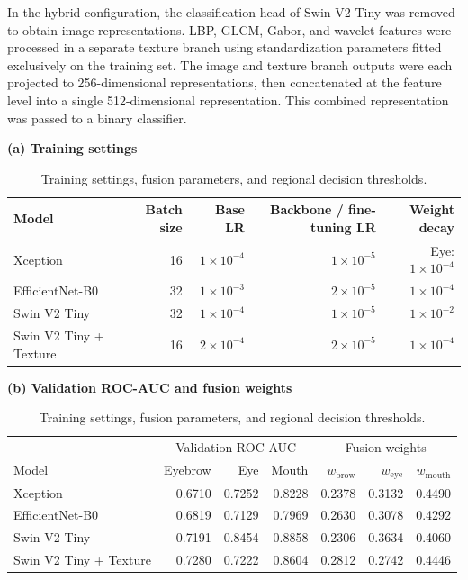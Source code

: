 \documentclass[a4paper]{elektr}
\begin{document}
In the hybrid configuration, the classification head of Swin V2 Tiny was removed to obtain image representations. LBP, GLCM, Gabor, and wavelet features were processed in a separate texture branch using standardization parameters fitted exclusively on the training set. The image and texture branch outputs were each projected to 256-dimensional representations, then concatenated at the feature level into a single 512-dimensional representation. This combined representation was passed to a binary classifier.
\begin{table}[!htbp]\centering\begin{minipage}{15.8cm}
\caption{Training settings, fusion parameters, and regional decision thresholds.}\label{tab:settings}
\centering\small
\textbf{(a) Training settings}\par\smallskip
\begin{tabular*}{\linewidth}{@{\extracolsep{\fill}}lrrrr@{}}\toprule
Model & Batch size & Base LR & Backbone / fine-tuning LR & Weight decay\\\midrule
Xception & 16 & $1\times10^{-4}$ & $1\times10^{-5}$ & Eye: $1\times10^{-4}$\\
EfficientNet-B0 &32&$1\times10^{-3}$&$2\times10^{-5}$&$1\times10^{-4}$\\
Swin V2 Tiny &32&$1\times10^{-4}$&$1\times10^{-5}$&$1\times10^{-2}$\\
Swin V2 Tiny + Texture &16&$2\times10^{-4}$&$2\times10^{-5}$&$1\times10^{-4}$\\\bottomrule
\end{tabular*}
\par\medskip
\textbf{(b) Validation ROC-AUC and fusion weights}\par\smallskip
\begin{tabular*}{\linewidth}{@{\extracolsep{\fill}}lrrrrrr@{}}\toprule
&\multicolumn{3}{c}{Validation ROC-AUC}&\multicolumn{3}{c}{Fusion weights}\\
Model & Eyebrow & Eye & Mouth & $w_{\mathrm{brow}}$ & $w_{\mathrm{eye}}$ & $w_{\mathrm{mouth}}$\\\midrule
Xception&0.6710&0.7252&0.8228&0.2378&0.3132&0.4490\\
EfficientNet-B0&0.6819&0.7129&0.7969&0.2630&0.3078&0.4292\\
Swin V2 Tiny&0.7191&0.8454&0.8858&0.2306&0.3634&0.4060\\
Swin V2 Tiny + Texture&0.7280&0.7222&0.8604&0.2812&0.2742&0.4446\\\bottomrule
\end{tabular*}

\end{minipage}
\end{table}
\end{document}
